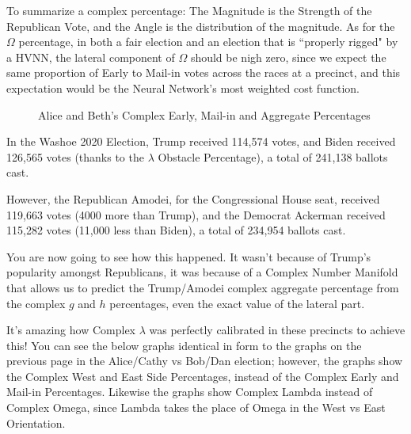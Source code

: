 \documentclass[preprint,13pt]{elsarticle}
\begin{document}
To summarize a complex percentage: The Magnitude is the Strength of the Republican Vote, and the Angle is the distribution of the magnitude. As for the $\Omega$ percentage, in both a fair election and an election that is ``properly rigged" by a HVNN, the lateral component of $\Omega$ should be nigh zero, since we expect the same proportion of Early to Mail-in votes across the races at a precinct, and this expectation would be the Neural Network's most weighted cost function.
\begin{figure}[bp!]
\begin{center}
\caption{Alice and Beth's Complex Early, Mail-in and Aggregate Percentages}
\noindent{}
\end{center}
\end{figure}
\newpage
In the Washoe 2020 Election, Trump received 114,574 votes, and Biden received 126,565 votes (thanks to the $\lambda$ Obstacle Percentage), a total of 241,138 ballots cast.

However, the Republican Amodei, for the Congressional House seat, received 119,663 votes (4000 more than Trump), and the Democrat Ackerman received 115,282 votes (11,000 less than Biden), a total of 234,954 ballots cast.

You are now going to see how this happened. It wasn't because of Trump's popularity amongst Republicans, it was because of a Complex Number Manifold that allows us to predict the Trump/Amodei complex aggregate percentage from the complex $g$ and $h$ percentages, even the exact value of the lateral part. 

It's amazing how Complex $\lambda$ was perfectly calibrated in these precincts to achieve this! You can see the below graphs identical in form to the graphs on the previous page in the Alice/Cathy vs Bob/Dan election; however, the graphs show the Complex West and East Side Percentages, instead of the Complex Early and Mail-in Percentages. Likewise the graphs show Complex Lambda instead of Complex Omega, since Lambda takes the place of Omega in the West vs East Orientation.
\end{document}
